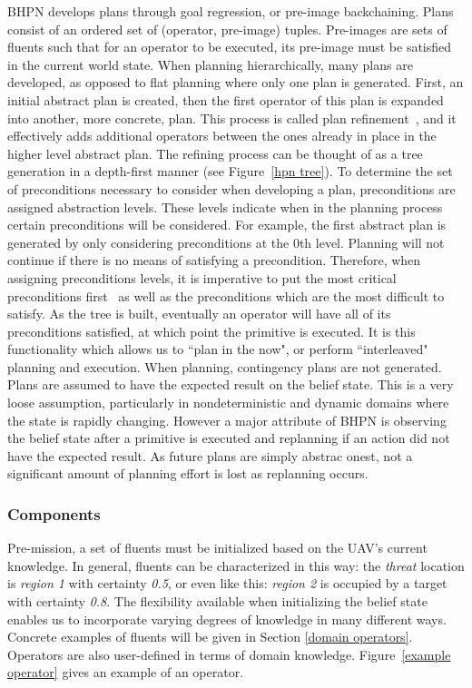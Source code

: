 \documentclass[12pt]{article}
\begin{document}
BHPN develops plans through goal regression, or pre-image backchaining. Plans consist of an ordered set of (operator, pre-image) tuples. Pre-images are sets of fluents such that for an operator to be executed, its pre-image must be satisfied in the current world state. When planning hierarchically, many plans are developed, as opposed to flat planning where only one plan is generated. First, an initial abstract plan is created, then the first operator of this plan is expanded into another, more concrete, plan. This process is called plan refinement~\cite{bacchus1994downward}, and it effectively adds additional operators between the ones already in place in the higher level abstract plan. The refining process can be thought of as a tree generation in a depth-first manner (see Figure~\ref{hpn tree}). To determine the set of preconditions necessary to consider when developing a plan, preconditions are assigned abstraction levels. These levels indicate when in the planning process certain preconditions will be considered. For example, the first abstract plan is generated by only considering preconditions at the 0th level. Planning will not continue if there is no means of satisfying a precondition. Therefore, when assigning preconditions levels, it is imperative to put the most critical preconditions first~\cite{sacerdoti1974planning} as well as the preconditions which are the most difficult to satisfy. As the tree is built, eventually an operator will have all of its preconditions satisfied, at which point the primitive is executed. It is this functionality which allows us to ``plan in the now", or perform ``interleaved" planning and execution. When planning, contingency plans are not generated. Plans are assumed to have the expected result on the belief state. This is a very loose assumption, particularly in nondeterministic and dynamic domains where the state is rapidly changing. However a major attribute of BHPN is observing the belief state after a primitive is executed and replanning if an action did not have the expected result. As future plans are simply abstrac onest, not a significant amount of planning effort is lost as replanning occurs.

\subsubsection{Components}

Pre-mission, a set of fluents must be initialized based on the UAV's current knowledge. In general, fluents can be characterized in this way: the \textit{threat} location is \textit{region 1} with certainty \textit{0.5}, or even like this: \textit{region 2} is occupied by a target with certainty \textit{0.8}. The flexibility available when initializing the belief state enables us to incorporate varying degrees of knowledge in many different ways. Concrete examples of fluents will be given in Section \ref{domain operators}. Operators are also user-defined in terms of domain knowledge. Figure~\ref{example operator} gives an example of an operator.
\end{document}
